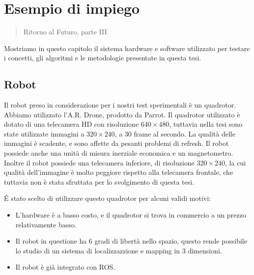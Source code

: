 \chapter{Esempio di impiego}
\label{app:esempio}
\thispagestyle{empty}

\begin{quotation}
{\footnotesize
{}
\begin{flushright}
Ritorno al Futuro, parte III
\end{flushright}
}
\end{quotation}
\vspace{0.5cm}

Mostriamo in questo capitolo il sistema hardware e software utilizzato per testare i concetti, gli algoritmi e le metodologie presentate in questa tesi.

\section{Robot}
Il robot preso in considerazione per i nostri test sperimentali è un quadrotor. Abbiamo utilizzato l'A.R. Drone, prodotto da Parrot. 
Il quadrotor utilizzato è dotato di una telecamera HD con risoluzione $640\times 480$, tuttavia nella tesi sono state utilizzate immagini a $320\times 240$, a 30 frame al secondo.
La qualità delle immagini è scadente, e sono affette da pesanti problemi di refresh.
Il robot possiede anche una unità di misura inerziale economica e un magnetometro.
Inoltre il robot possiede una telecamera inferiore, di risoluzione $320\times 240$, la cui qualità dell'immagine è molto peggiore rispetto alla telecamera frontale, che tuttavia non è stata sfruttata per lo svolgimento di questa tesi.

\'E stato scelto di utilizzare questo quadrotor per alcuni validi motivi:
\begin{itemize}
 \item L'hardware è a basso costo, e il quadrotor si trova in commercio a un prezzo relativamente basso.
 \item Il robot in questione ha 6 gradi di libertà nello spazio, questo rende possibile lo studio di un sistema di localizzazzione e mapping in 3 dimensioni.
 \item Il robot è già integrato con ROS.
\end{itemize}


